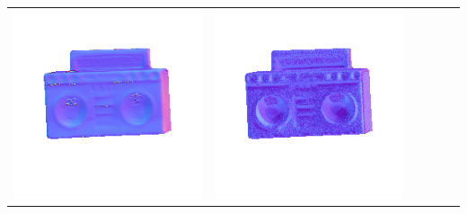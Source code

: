 \begin{tabularx}{\linewidth}{@{}Y@{}Y@{}Y@{}Y@{}Y@{}Y@{}}
\includegraphics[width=\linewidth]{semisynthetic/20160617_19_yu_out.png} &
\includegraphics[width=\linewidth]{semisynthetic/20160617_19_dpsn_out.png} &

\end{tabularx}
